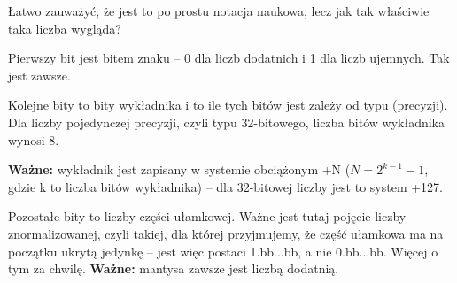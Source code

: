 Łatwo zauważyć, że jest to po prostu notacja naukowa, lecz jak tak właściwie taka liczba wygląda?

Pierwszy bit jest bitem znaku -- 0 dla liczb dodatnich i 1 dla liczb ujemnych. Tak jest zawsze.

Kolejne bity to bity wykładnika i to ile tych bitów jest zależy od typu (precyzji).
Dla liczby pojedynczej precyzji, czyli typu 32-bitowego, liczba bitów wykładnika wynosi 8.

\textbf{Ważne:} wykładnik jest zapisany w systemie obciążonym +N ($N = 2^{k-1}-1$, gdzie k to liczba bitów wykładnika) -- dla 32-bitowej liczby jest to system +127.

Pozostałe bity to liczby części ułamkowej.
Ważne jest tutaj pojęcie liczby znormalizowanej, czyli takiej, dla której przyjmujemy, że część ułamkowa ma na początku ukrytą jedynkę -- jest więc postaci 1.bb...bb, a nie 0.bb...bb.
Więcej o tym za chwilę.
\textbf{Ważne:} mantysa zawsze jest liczbą dodatnią.


